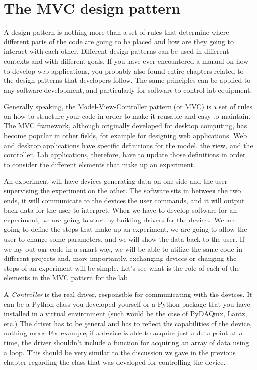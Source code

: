 \section{\texorpdfstring{The {MVC}
design pattern}{The MVC design pattern}}\label{the-mvc-designpattern}

A design pattern is nothing more than a set of rules that determine
where different parts of the code are going to be placed and how are
they going to interact with each other. Different design patterns can be
used in different contexts and with different goals. If you have ever
encountered a manual on how to develop web applications, you probably
also found entire chapters related to the design patterns that
developers follow. The same principles can be applied to any software
development, and particularly for software to control lab equipment.

Generally speaking, the Model-View-Controller pattern (or {MVC}) is a
set of rules on how to structure your code in order to make it reusable
and easy to maintain. The {MVC} framework, although originally developed
for desktop computing, has become popular in other fields, for example
for designing web applications. Web and desktop applications have
specific definitions for the model, the view, and the controller. Lab
applications, therefore, have to update those definitions in order to
consider the different elements that make up an experiment.

An experiment will have devices generating data on one side and the user
supervising the experiment on the other. The software sits in between
the two ends, it will communicate to the devices the user commands, and
it will output back data for the user to interpret. When we have to
develop software for an experiment, we are going to start by building
drivers for the devices. We are going to define the steps that make up
an experiment, we are going to allow the user to change some parameters,
and we will show the data back to the user. If we lay out our code in a
smart way, we will be able to utilize the same code in different
projects and, more importantly, exchanging devices or changing the steps
of an experiment will be simple. Let's see what is the role of each of
the elements in the {MVC} pattern for the lab.

A \emph{Controller} is the real driver, responsible for communicating
with the devices. It can be a Python class you developed yourself or a
Python package that you have installed in a virtual environment (such
would be the case of PyDAQmx, Lantz, etc.) The driver has to be general
and has to reflect the capabilities of the device, nothing more. For
example, if a device is able to acquire just a data point at a time, the
driver shouldn't include a function for acquiring an array of data using
a loop. This should be very similar to the discussion we gave in the
previous chapter regarding the class that was developed for controlling
the device.

